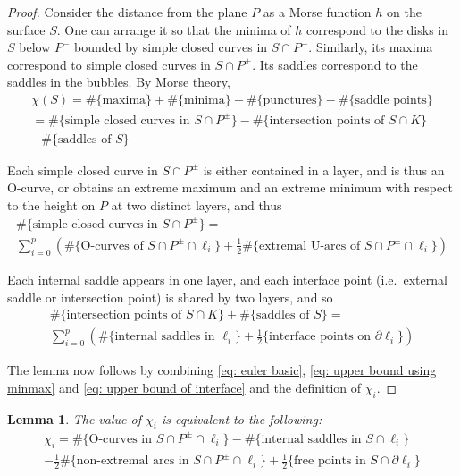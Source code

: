 \documentclass[12pt,reqno]{amsart}
\theoremstyle{plain}
\newtheorem{lemma}[theorem]{Lemma}
\theoremstyle{definition}
\newcommand{\bdy}{\partial}
\begin{document}
\begin{proof}
Consider the distance from the plane $P$ as a Morse function $h$ on the surface $S$. 
One can arrange it so that the minima of $h$ correspond to the disks in $S$ below 
$P^-$ bounded by simple closed curves in $S\cap P^-$. Similarly, its maxima 
correspond to simple closed curves in $S\cap P^+$. Its saddles correspond to 
the saddles in the bubbles. By Morse theory, 
\begin{multline}\label{eq: euler basic}
\chi(S) = \#\{\text{maxima}\} + \#\{\text{minima}\}  - \#\{\text{punctures}\}
- \#\{\text{saddle points}\} \\
=\#\{\text{simple closed curves in }S\cap P^\pm\} - \#\{\text{intersection points 
of }S\cap K\} \\-\#\{\text{saddles of }S\}
\end{multline}    

Each simple closed curve in $S\cap P^\pm$ is either contained in a layer, and is 
thus an O-curve, or obtains an extreme maximum and an extreme minimum with respect 
to the height on $P$ at two distinct layers, and thus 
\begin{multline}\label{eq: upper bound using minmax}
\#\{\text{simple closed curves in }S\cap P^\pm\} = \\
\sum_{i=0}^{p}
\left( \#\{\text{O-curves of }S\cap P^\pm \cap \ell_i\} + 
\tfrac12\#\{\text{extremal U-arcs of }S\cap P^\pm \cap \ell_i \} \right)
\end{multline}

Each internal saddle appears in one layer, and each interface point 
(i.e.\ external saddle or intersection point) is shared by two layers, and so
\begin{multline}\label{eq: upper bound of interface}
\#\{\text{intersection points of }S\cap K\} +\#\{\text{saddles of }S\} = \\
\sum_{i=0}^{p} \left(\#\{\text{internal saddles in }\ell_i\} + \tfrac12
\{\text{interface points on }\bdy\ell_i\}\right)
\end{multline}

The lemma now follows by combining \eqref{eq: euler basic},
\eqref{eq: upper bound using minmax} and \eqref{eq: upper bound of interface} and 
the definition of $\chi_i$.
\end{proof}

\begin{lemma}\label{Lem:Chi_i equivalence}
The value of $\chi_i$ is equivalent to the following:
\begin{multline}\label{eq: chi_i equivalent def}
\chi_i =
\#\{\text{O-curves in }S\cap P^\pm \cap \ell_i\}- \#\{\text{internal saddles in }S\cap\ell_i\}\\
- \tfrac12\#\{\text{non-extremal arcs in }S\cap P^\pm\cap\ell_i\}  + 
\tfrac12\{\text{free points in }S\cap \bdy\ell_i\}
\end{multline}
\end{lemma}
\end{document}
